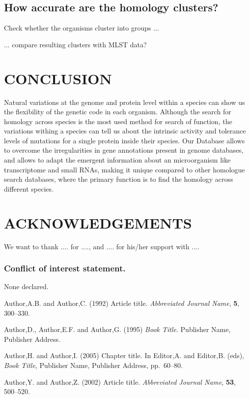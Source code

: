 \documentclass[a4,center,fleqn]{NAR}
\begin{document}
\subsection{How accurate are the homology clusters?}

Check whether the organisms cluster into groups ...

... compare resulting clusters with MLST data?

\section{CONCLUSION}

Natural variations at the genome and protein level within a species can show us the flexibility of the genetic code in each organism. Although the search for homology across species is the most used method for search of  function, the variations withing a species can tell us about the intrinsic activity and tolerance levels of mutations for a single protein inside their species. Our Database allows to overcome the irregularities in gene annotations present in genome databases, and allows to adapt the emergent information about an microorganism like transcriptome and small RNAs, making it unique compared to other homologue search databases, where the primary function is to find the homology across different species.



\section{ACKNOWLEDGEMENTS}

We want to thank .... for ...., and .... for his/her support with ....


\subsubsection{Conflict of interest statement.} None declared.
\newpage


\begin{thebibliography}{4}

Author,A.B. and Author,C. (1992)
Article title.
\textit{Abbreviated Journal Name}, \textbf{5}, 300--330.

Author,D., Author,E.F. and Author,G. (1995)
\textit{Book Title}.
Publisher Name, Publisher Address.

Author,H. and Author,I. (2005)
Chapter title.
In
Editor,A. and Editor,B. (eds),
\textit{Book Title},
Publisher Name, Publisher Address,
pp.\ 60--80.

Author,Y. and Author,Z. (2002)
Article title.
\textit{Abbreviated Journal Name}, \textbf{53}, 500--520.

\end{thebibliography}
\end{document}
